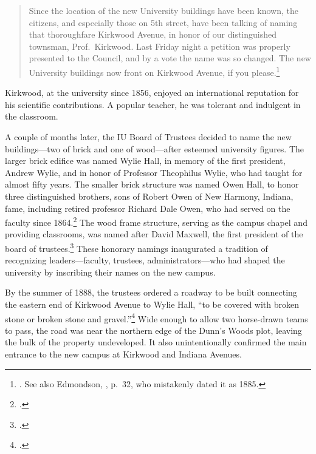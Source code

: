 \documentclass[
  american,
  letterpaper,
]{scrreprt}
\begin{document}
\begin{quote}
Since the location of the new University buildings have been known, the
citizens, and especially those on 5th street, have been talking of
naming that thoroughfare Kirkwood Avenue, in honor of our distinguished
townsman, Prof.~Kirkwood. Last Friday night a petition was properly
presented to the Council, and by a vote the name was so changed. The new
University buildings now front on Kirkwood Avenue, if you
please.\footnote{{}. See also Edmondson,
  , p.~32, who mistakenly dated it as 1885.}
\end{quote}

Kirkwood, at the university since 1856, enjoyed an international
reputation for his scientific contributions. A popular teacher, he was
tolerant and indulgent in the classroom.

A couple of months later, the IU Board of Trustees decided to name the
new buildings---two of brick and one of wood---after esteemed university
figures. The larger brick edifice was named Wylie Hall, in memory of the
first president, Andrew Wylie, and in honor of Professor Theophilus
Wylie, who had taught for almost fifty years. The smaller brick
structure was named Owen Hall, to honor three distinguished brothers,
sons of Robert Owen of New Harmony, Indiana, fame, including retired
professor Richard Dale Owen, who had served on the faculty since
1864.\footnote{.} The wood frame structure, serving as
the campus chapel and providing classrooms, was named after David
Maxwell, the first president of the board of trustees.\footnote{.}
These honorary namings inaugurated a tradition of recognizing
leaders---faculty, trustees, administrators---who had shaped the
university by inscribing their names on the new campus.

By the summer of 1888, the trustees ordered a roadway to be built
connecting the eastern end of Kirkwood Avenue to Wylie Hall, ``to be
covered with broken stone or broken stone and gravel.''\footnote{.}
Wide enough to allow two horse-drawn teams to pass, the road was near
the northern edge of the Dunn's Woods plot, leaving the bulk of the
property undeveloped. It also unintentionally confirmed the main
entrance to the new campus at Kirkwood and Indiana Avenues.
\end{document}

